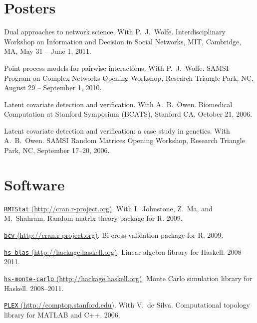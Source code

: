 \documentclass[10pt,letterpaper]{article}
\renewenvironment{itemize}{
  \begin{list}{}{
    \setlength{\leftmargin}{1.5em}
    \setlength{\itemsep}{0.25em}
    \setlength{\parskip}{0pt}
    \setlength{\parsep}{0.25em}
  }
}{
  \end{list}
}
\begin{document}
\section*{Posters}
\begin{itemize}
\item Dual approaches to network science.
  With P.~J.~Wolfe.
  Interdisciplinary Workshop on Information and Decision in Social Networks,
  MIT, Cambridge, MA,
  May 31 -- June 1, 2011.

\item Point process models for pairwise interactions.
  With P.~J.~Wolfe.
  SAMSI Program on Complex Networks Opening Workshop,
  Research Triangle Park, NC,
  August 29 -- September 1, 2010.

\item Latent covariate detection and verification.
  With A.~B.~Owen.
  Biomedical Computation at Stanford Symposium (BCATS),
  Stanford CA,
  October 21, 2006.

\item Latent covariate detection and verification: a case study in genetics.
  With A.~B.~Owen.
  SAMSI Random Matrices Opening Workshop,
  Research Triangle Park, NC,
  September 17--20, 2006.
\end{itemize}


\section*{Software}
\begin{itemize}
\item \href{http://cran.r-project.org/web/packages/RMTstat/index.html}
{\texttt{RMTStat} (http://cran.r-project.org)}.
With I.~Johnstone, Z.~Ma, and M.~Shahram.
Random matrix theory package for R.
2009.

\item \href{http://cran.r-project.org/web/packages/bcv/index.html}
{\texttt{bcv} (http://cran.r-project.org)}.
Bi-cross-validation package for R.
2009.

\item \href{http://hackage.haskell.org/cgi-bin/hackage-scripts/package/blas}
{\texttt{hs-blas} (http://hackage.haskell.org)}.
Linear algebra library for Haskell.
2008--2011.

\item \href{http://hackage.haskell.org/cgi-bin/hackage-scripts/package/monte-carlo}
{\texttt{hs-monte-carlo} (http://hackage.haskell.org)}.
Monte Carlo simulation library for Haskell.
2008--2011.

\item \href{http://comptop.stanford.edu/programs/plex.html}
{\texttt{PLEX} (http://comptop.stanford.edu)}.
With V.\ de Silva.
Computational topology library for \textsc{MATLAB} and C++.
2006.

\end{itemize}
\end{document}
